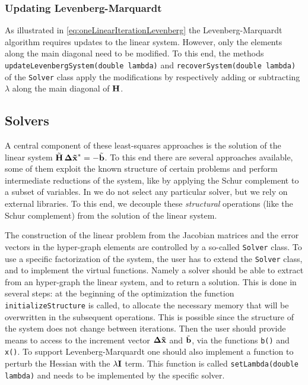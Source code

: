 \documentclass[a4paper]{article}
\begin{document}
\subsubsection{Updating Levenberg-Marquardt}
As illustrated in \eqref{eq:oneLinearIterationLevenberg} the
Levenberg-Marquardt algorithm requires updates to the linear system.
However, only the elements along the main diagonal need to be modified.
To this end, the methods \verb+updateLevenbergSystem(double lambda)+ and
\verb+recoverSystem(double lambda)+ of the \verb+Solver+ class apply the
modifications by respectively adding or subtracting $\lambda$ along the
main diagonal of $\mathbf{H}$.

\subsection{Solvers}
A central component of these least-squares approaches is the solution
of the linear system $\tilde {\mathbf{H}} \, \mathbf{\Delta \tilde x}^* = - \tilde {\mathbf{b}}$. To
this end there are several approaches available, some of them exploit
the known structure of certain problems and perform intermediate
reductions of the system, like by applying the Schur complement to a
subset of variables.  In \gopt{} we do not select any particular solver,
but we rely on external libraries.  To this end, we decouple these
\emph{structural} operations (like the Schur complement)
from the solution of the linear system.

The construction of the linear problem from the Jacobian matrices and the error vectors
in the hyper-graph elements are controlled by a so-called \verb+Solver+ class.
To use a specific factorization of the system, the user has to extend the
\verb+Solver+ class, and to implement the virtual functions.
Namely a solver should be able to extract from an
hyper-graph the linear system, and to return a solution.  This is
done in several steps: at the beginning of the optimization the
function \verb+initializeStructure+ is called, to allocate the
necessary memory that will be overwritten in the subsequent
operations. This is possible since the structure of the system does
not change between iterations. Then the user should provide means to
access to the increment vector $\mathbf{\Delta \tilde x}$ and $\tilde {\mathbf{b}}$, via the
functions \verb+b()+ and \verb+x()+. To support Levenberg-Marquardt
one should also implement a function to perturb the Hessian with the
$\lambda \mathbf{I}$ term. This function is called
\verb+setLambda(double lambda)+ and needs to be implemented by the
specific solver.
\end{document}
